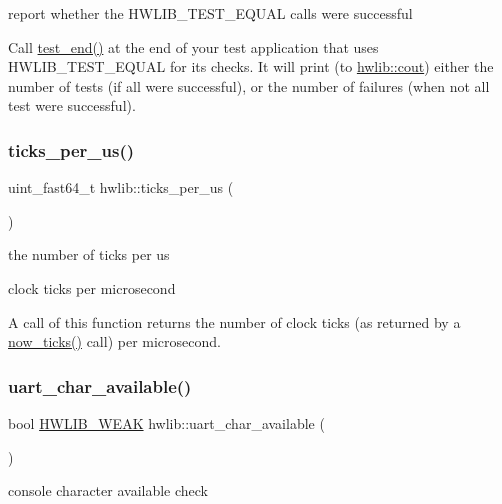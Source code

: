 report whether the H\+W\+L\+I\+B\+\_\+\+T\+E\+S\+T\+\_\+\+E\+Q\+U\+AL calls were successful 

Call \hyperlink{namespacehwlib_af30c15244b6a508f320f01317dc84d7f}{test\+\_\+end()} at the end of your test application that uses H\+W\+L\+I\+B\+\_\+\+T\+E\+S\+T\+\_\+\+E\+Q\+U\+AL for its checks. It will print (to \hyperlink{namespacehwlib_a7de728368e57486f51717f911401a604}{hwlib\+::cout}) either the number of tests (if all were successful), or the number of failures (when not all test were successful). \mbox{\label{namespacehwlib_a0d513bcd3062ebfea65bcb2c82e0c1a8}} 
\subsubsection{\texorpdfstring{ticks\+\_\+per\+\_\+us()}{ticks\_per\_us()}}
{\footnotesize\ttfamily uint\+\_\+fast64\+\_\+t hwlib\+::ticks\+\_\+per\+\_\+us (\begin{DoxyParamCaption}{ }\end{DoxyParamCaption})}



the number of ticks per us 

clock ticks per microsecond

A call of this function returns the number of clock ticks (as returned by a \hyperlink{namespacehwlib_a004512830e68d72d8fd0e3153895e65b}{now\+\_\+ticks()} call) per microsecond. \mbox{\label{namespacehwlib_aaf31868f62815d2e405ad90469ae50a5}} 
\subsubsection{\texorpdfstring{uart\+\_\+char\+\_\+available()}{uart\_char\_available()}}
{\footnotesize\ttfamily bool \hyperlink{hwlib-defines_8hpp_a04be4340016df60d6636c1d1c6d94fc9}{H\+W\+L\+I\+B\+\_\+\+W\+E\+AK} hwlib\+::uart\+\_\+char\+\_\+available (\begin{DoxyParamCaption}{ }\end{DoxyParamCaption})}

console character available check

